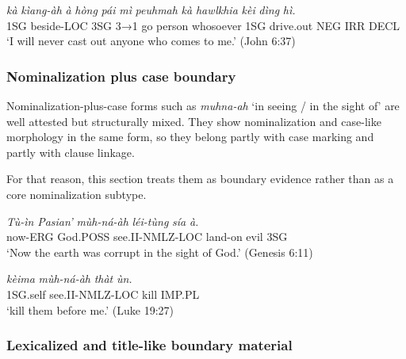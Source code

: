 \documentclass[
  11pt,
  a4paper,
]{article}
\newcommand{\tdim}[1]{\textit{#1}}
\newcommand{\tdimword}[1]{\textit{#1}}
\renewcommand{\textsc}[1]{{\footnotesize\MakeUppercase{#1}}}
\newcommand{\glossquote}[1]{`#1'}
\begin{document}
\begin{exe}
\ex \label{ex:nmlz-hong-pai-mi-john6}
\gll \tdimword{kà} \tdimword{kìang-àh} \tdimword{à} \tdimword{hòng} \tdimword{pái} \tdimword{mì} \tdimword{peuhmah} \tdimword{kà} \tdimword{hawlkhia} \tdimword{kèi} \tdimword{dìng} \tdimword{hì.} \\
     \textsc{1sg} beside-\textsc{loc} \textsc{3sg} \textsc{3→1} go person whosoever \textsc{1sg} drive.out \textsc{neg} \textsc{irr} \textsc{decl} \\
\glt \glossquote{I will never cast out anyone who comes to me.} (John 6:37)
\end{exe}

\subsubsection{Nominalization plus case
boundary}\label{nominalization-plus-case-boundary}

Nominalization-plus-case forms such as \tdim{muhna-ah}
\glossquote{in seeing / in the sight of} are well attested but
structurally mixed. They show nominalization and case-like morphology in
the same form, so they belong partly with case marking and partly with
clause linkage.

For that reason, this section treats them as boundary evidence rather
than as a core nominalization subtype.

\begin{exe}
\ex \label{ex:nmlz-muhna-ah-gen6}
\gll \tdimword{Tù-ìn} \tdimword{Pasian'} \tdimword{mùh-ná-àh} \tdimword{léi-tùng} \tdimword{sía} \tdimword{à.} \\
     now-\textsc{erg} God.\textsc{poss} see.\textsc{ii}-\textsc{nmlz}-\textsc{loc} land-on evil \textsc{3sg} \\
\glt \glossquote{Now the earth was corrupt in the sight of God.} (Genesis 6:11)
\end{exe}

\begin{exe}
\ex \label{ex:nmlz-muhna-ah-luke19}
\gll \tdimword{kèima} \tdimword{mùh-ná-àh} \tdimword{thàt} \tdimword{ùn.} \\
     \textsc{1sg}.self see.\textsc{ii}-\textsc{nmlz}-\textsc{loc} kill \textsc{imp}.\textsc{pl} \\
\glt \glossquote{kill them before me.} (Luke 19:27)
\end{exe}

\subsubsection{Lexicalized and title-like boundary
material}\label{lexicalized-and-title-like-boundary-material}
\end{document}
